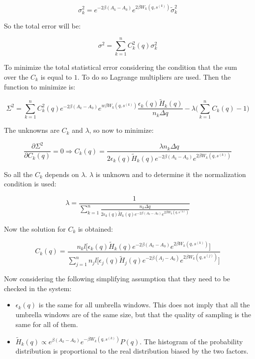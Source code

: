 	$$\sigma_k^2 = e^{-2\beta(A_k-A_0)}e^{2\beta W_k(q, s^{(k)})}\tilde{\sigma}_k^2$$

	So the total error will be:

	$$\sigma^2 = \sum\limits_{k=1}^nC_k^2(q)\sigma_k^2$$

	To minimize the total statistical error considering the condition that the sum over the $C_k$ is equal to $1$.
	To do so Lagrange multipliers are used.
	Then the function to minimize is:

	$$\Sigma^2=\sum\limits_{k=1}^nC_k^2(q)e^{-2\beta (A_k-A_0)}e^{w\beta W_k(q, s^{(k)})}\frac{\epsilon_k(q)\tilde{H}_k(q)}{n_k\Delta q}-\lambda\biggl(\sum\limits_{k=1}^nC_k(q)-1\biggr)$$

	The unknowns are $C_k$ and $\lambda$, so now to minimize:

	$$\frac{\partial\Sigma^2}{\partial C_k(q)} = 0\Rightarrow C_k(q) = \frac{\lambda n_k\Delta q}{2\epsilon_k(q)\tilde{H}_k(q)e^{-2\beta(A_k-A_0)}e^{2\beta W_k(q, s^{(k)})}}$$

	So all the $C_k$ depends on $\lambda$.
	$\lambda$ is unknown and to determine it the normalization condition is used:

	$$\lambda = \frac{1}{\sum\limits_{k=1}^n\frac{n_k\Delta q}{2\epsilon_k(q)\tilde{H}_k(q)e^{-2\beta(A_k-A_0)}e^{2\beta W_k(q, s^{(k)})}}}$$

	Now the solution for $C_k$ is obtained:

	$$C_k(q) =\frac{n_kl\bigl[\epsilon_k(q)\tilde{H}_k(q)e^{-2\beta(A_k-A_0)}e^{2\beta W_k(q, s^{(k)})}\bigr]}{\sum\limits_{j=1}^n n_jl\bigl[\epsilon_j(q)\tilde{H}_j(q)e^{-2\beta(A_j-A_0)}e^{2\beta W_k(q, s^{(j)})}\bigr]}$$

	Now considering the following simplifying assumption that they need to be checked in the system:

	\begin{multicols}{2}
		\begin{itemize}
			\item $\epsilon_k(q)$ is the same for all umbrella windows.
				This does not imply that all the umbrella windows are of the same size, but that the quality of sampling is the same for all of them.
			\item $\tilde{H}_k(q)\propto e^{\beta(A_k-A_0)}e^{-\beta W_k(q, s^{(k)})}P(q)$.
				The histogram of the probability distribution is proportional to the real distribution biased by the two factors.
		\end{itemize}
	\end{multicols}

